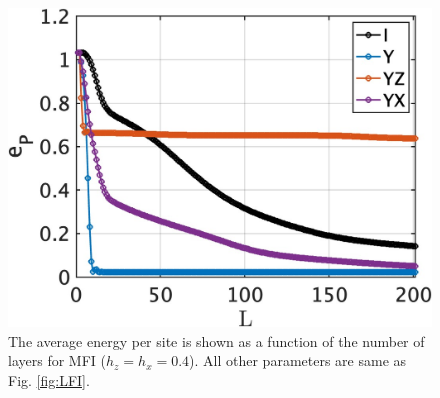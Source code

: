 \documentclass[twocolumn,aps,superscriptaddress,floatfix,longbibliography]{revtex4-2}
\begin{document}



\begin{figure}
\centering
\includegraphics[scale=0.18]{MFIM.jpg}
\caption{
   The average energy per site is shown as a function of the number of
   layers for MFI ($h_z=h_x=0.4$). %
   All other parameters are same as Fig. \ref{fig:LFI}.
}
\label{fig:MFI}
\end{figure}

\end{document}
